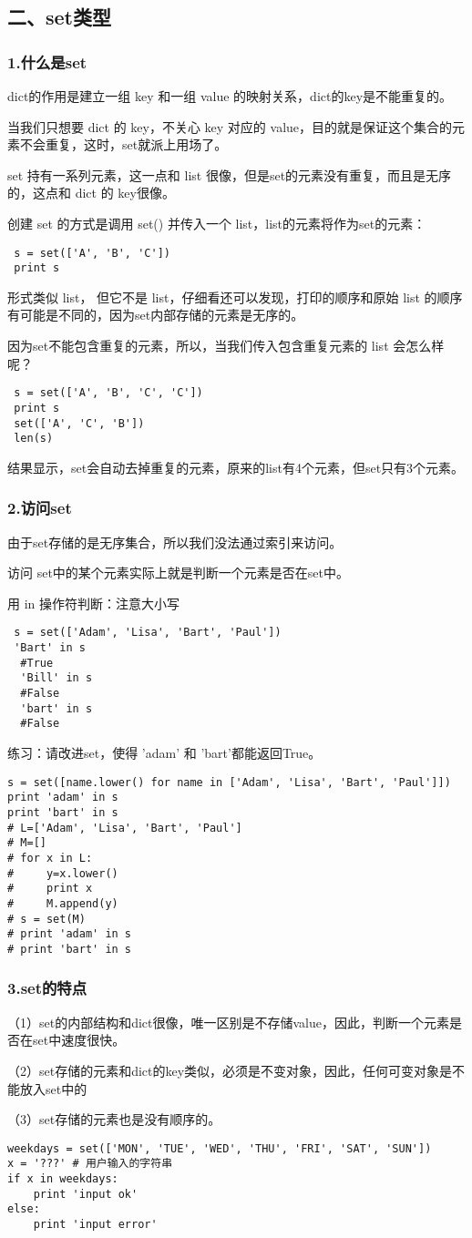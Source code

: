 \documentclass{article}
\begin{document}
\begin{CJK}{UTF8}{gbsn}
\part*{二、set类型}
\section*{1.什么是set}
\subparagraph*{}
dict的作用是建立一组 key 和一组 value 的映射关系，dict的key是不能重复的。
\subparagraph*{}
当我们只想要 dict 的 key，不关心 key 对应的 value，目的就是保证这个集合的元素不会重复，这时，set就派上用场了。
\subparagraph*{}
set 持有一系列元素，这一点和 list 很像，但是set的元素没有重复，而且是无序的，这点和 dict 的 key很像。
\subparagraph*{}
创建 set 的方式是调用 set() 并传入一个 list，list的元素将作为set的元素：
\begin{verbatim}
 s = set(['A', 'B', 'C'])
 print s
\end{verbatim}
\subparagraph*{}
形式类似 list， 但它不是 list，仔细看还可以发现，打印的顺序和原始 list 的顺序有可能是不同的，因为set内部存储的元素是无序的。
\subparagraph*{}
因为set不能包含重复的元素，所以，当我们传入包含重复元素的 list 会怎么样呢？
\begin{verbatim}
 s = set(['A', 'B', 'C', 'C'])
 print s
 set(['A', 'C', 'B'])
 len(s)
\end{verbatim}
\subparagraph*{}
结果显示，set会自动去掉重复的元素，原来的list有4个元素，但set只有3个元素。
\section*{2.访问set}
\subparagraph*{}
由于set存储的是无序集合，所以我们没法通过索引来访问。
\subparagraph*{}
访问 set中的某个元素实际上就是判断一个元素是否在set中。
\subparagraph*{}
用 in 操作符判断：注意大小写
\begin{verbatim}
 s = set(['Adam', 'Lisa', 'Bart', 'Paul'])
 'Bart' in s
  #True
  'Bill' in s
  #False
  'bart' in s
  #False
\end{verbatim}
\subparagraph*{}
练习：请改进set，使得 'adam' 和 'bart'都能返回True。
\begin{verbatim}
s = set([name.lower() for name in ['Adam', 'Lisa', 'Bart', 'Paul']])
print 'adam' in s
print 'bart' in s
# L=['Adam', 'Lisa', 'Bart', 'Paul']
# M=[]
# for x in L:
#     y=x.lower()
#     print x
#     M.append(y)
# s = set(M)
# print 'adam' in s
# print 'bart' in s
\end{verbatim}
\section*{3.set的特点}
\subparagraph*{}
（1）set的内部结构和dict很像，唯一区别是不存储value，因此，判断一个元素是否在set中速度很快。
\subparagraph*{}
（2）set存储的元素和dict的key类似，必须是不变对象，因此，任何可变对象是不能放入set中的
\subparagraph*{}
（3）set存储的元素也是没有顺序的。
\begin{verbatim}
weekdays = set(['MON', 'TUE', 'WED', 'THU', 'FRI', 'SAT', 'SUN'])
x = '???' # 用户输入的字符串
if x in weekdays:
    print 'input ok'
else:
    print 'input error'
\end{verbatim}

\end{CJK}
\end{document}
